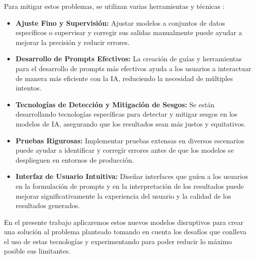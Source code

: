Para mitigar estos problemas, se utilizan varias herramientas y técnicas  \citep{TowardsAI2024}:

\begin{itemize}
    \item \textbf{Ajuste Fino y Supervisión:} Ajustar modelos a conjuntos de datos específicos o supervisar y corregir sus salidas manualmente puede ayudar a mejorar la precisión y reducir errores.
    \item \textbf{Desarrollo de Prompts Efectivos:} La creación de guías y herramientas para el desarrollo de prompts más efectivos ayuda a los usuarios a interactuar de manera más eficiente con la IA, reduciendo la necesidad de múltiples intentos.\citep{HatchWorks2024} \citep{arXiv2024Prompt}
    \item \textbf{Tecnologías de Detección y Mitigación de Sesgos:} Se están desarrollando tecnologías específicas para detectar y mitigar sesgos en los modelos de IA, asegurando que los resultados sean más justos y equitativos.
    \item \textbf{Pruebas Rigurosas:} Implementar pruebas extensas en diversos escenarios puede ayudar a identificar y corregir errores antes de que los modelos se desplieguen en entornos de producción.
    \item \textbf{Interfaz de Usuario Intuitiva:} Diseñar interfaces que guíen a los usuarios en la formulación de prompts y en la interpretación de los resultados puede mejorar significativamente la experiencia del usuario y la calidad de los resultados generados.
\end{itemize}

En el presente trabajo aplicaremos estos nuevos modelos disruptivos para crear una solución al problema planteado tomando en cuenta los desafíos que conlleva el uso de estas tecnologías y experimentando para poder reducir lo máximo posible sus limitantes.